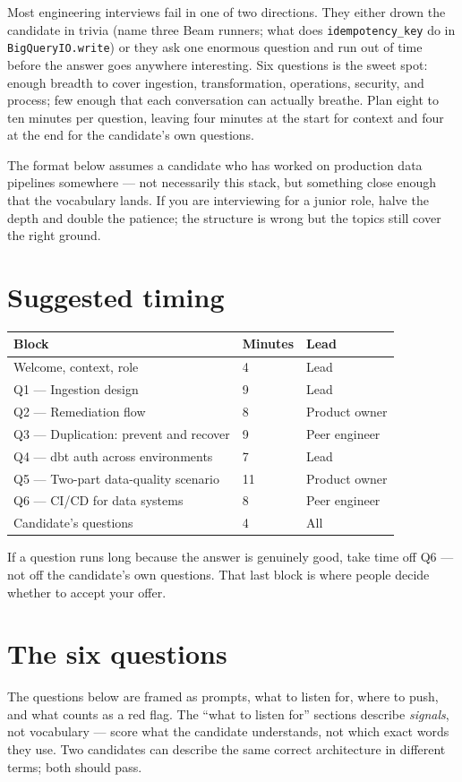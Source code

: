 \documentclass[
  11pt,
  british,
  oneside]{book}
\begin{document}
Most engineering interviews fail in one of two directions. They either
drown the candidate in trivia (name three Beam runners; what does
\texttt{idempotency\_key} do in \texttt{BigQueryIO.write}) or they ask
one enormous question and run out of time before the answer goes
anywhere interesting. Six questions is the sweet spot: enough breadth to
cover ingestion, transformation, operations, security, and process; few
enough that each conversation can actually breathe. Plan eight to ten
minutes per question, leaving four minutes at the start for context and
four at the end for the candidate's own questions.

The format below assumes a candidate who has worked on production data
pipelines somewhere --- not necessarily this stack, but something close
enough that the vocabulary lands. If you are interviewing for a junior
role, halve the depth and double the patience; the structure is wrong
but the topics still cover the right ground.

\hypertarget{suggested-timing}{%
\section{Suggested timing}\label{suggested-timing}}

\begin{longtable}[]{@{}lll@{}}
\toprule
Block & Minutes & Lead\tabularnewline
\midrule
\endhead
Welcome, context, role & 4 & Lead\tabularnewline
Q1 --- Ingestion design & 9 & Lead\tabularnewline
Q2 --- Remediation flow & 8 & Product owner\tabularnewline
Q3 --- Duplication: prevent and recover & 9 & Peer
engineer\tabularnewline
Q4 --- dbt auth across environments & 7 & Lead\tabularnewline
Q5 --- Two-part data-quality scenario & 11 & Product
owner\tabularnewline
Q6 --- CI/CD for data systems & 8 & Peer engineer\tabularnewline
Candidate's questions & 4 & All\tabularnewline
\bottomrule
\end{longtable}

If a question runs long because the answer is genuinely good, take time
off Q6 --- not off the candidate's own questions. That last block is
where people decide whether to accept your offer.

\hypertarget{the-six-questions}{%
\section{The six questions}\label{the-six-questions}}

The questions below are framed as prompts, what to listen for, where to
push, and what counts as a red flag. The ``what to listen for'' sections
describe \emph{signals}, not vocabulary --- score what the candidate
understands, not which exact words they use. Two candidates can describe
the same correct architecture in different terms; both should pass.
\end{document}
